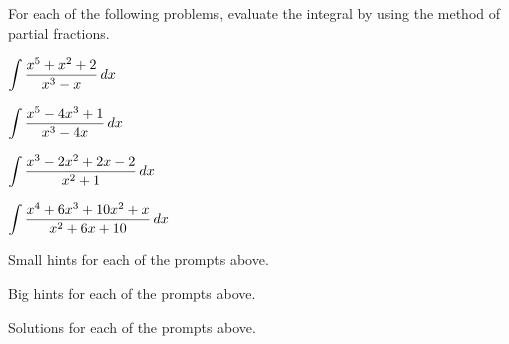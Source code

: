 \begin{activity} \label{A:5.4.2} For each of the following problems, evaluate the integral by using the method of partial fractions.

\bmtwo
\ba
\item $\displaystyle \int \frac{x^5 + x^2 + 2}{x^3 - x} \, dx$
	
\item $\displaystyle \int \frac{x^5 - 4x^3 + 1}{x^3 - 4x} \, dx$
	
\item $\displaystyle \int \frac{x^3 - 2x^2 + 2x - 2}{x^2 + 1}\, dx$

\item $\displaystyle \int \frac{x^4 + 6x^3 + 10x^2 + x}{x^2 + 6x + 10}\, dx$
\ea
\emtwo

\end{activity}
\begin{smallhint}
\ba
	\item Small hints for each of the prompts above.
\ea
\end{smallhint}
\begin{bighint}
\ba
	\item Big hints for each of the prompts above.
\ea
\end{bighint}
\begin{activitySolution}
\ba
	\item Solutions for each of the prompts above.
\ea
\end{activitySolution}
\aftera